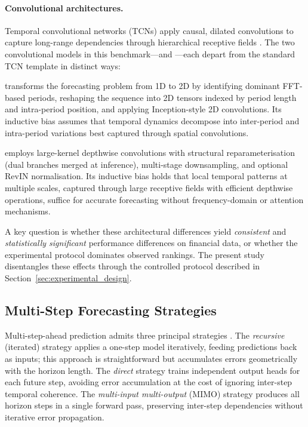\paragraph{Convolutional architectures.}
Temporal convolutional networks (TCNs) apply causal, dilated convolutions to capture long-range dependencies through hierarchical receptive fields \citep{BaiTCN2018}.  The two convolutional models in this benchmark---\timesnet and \moderntcn---each depart from the standard TCN template in distinct ways:

\timesnet \citep{Wu2023timesnet} transforms the forecasting problem from 1D to 2D by identifying dominant FFT-based periods, reshaping the sequence into 2D tensors indexed by period length and intra-period position, and applying Inception-style 2D convolutions.  Its inductive bias assumes that temporal dynamics decompose into inter-period and intra-period variations best captured through spatial convolutions.

\moderntcn \citep{Luo2024moderntcn} employs large-kernel depthwise convolutions with structural reparameterisation (dual branches merged at inference), multi-stage downsampling, and optional RevIN normalisation.  Its inductive bias holds that local temporal patterns at multiple scales, captured through large receptive fields with efficient depthwise operations, suffice for accurate forecasting without frequency-domain or attention mechanisms.

A key question is whether these architectural differences yield \emph{consistent} and \emph{statistically significant} performance differences on financial data, or whether the experimental protocol dominates observed rankings.  The present study disentangles these effects through the controlled protocol described in Section~\ref{sec:experimental_design}.

\subsection{Multi-Step Forecasting Strategies}
\label{sec:multistep_strategies}

Multi-step-ahead prediction admits three principal strategies \citep{Taieb2012, Chevillon2007}.  The \emph{recursive} (iterated) strategy applies a one-step model iteratively, feeding predictions back as inputs; this approach is straightforward but accumulates errors geometrically with the horizon length.  The \emph{direct} strategy trains independent output heads for each future step, avoiding error accumulation at the cost of ignoring inter-step temporal coherence.  The \emph{multi-input multi-output} (MIMO) strategy produces all horizon steps in a single forward pass, preserving inter-step dependencies without iterative error propagation.

